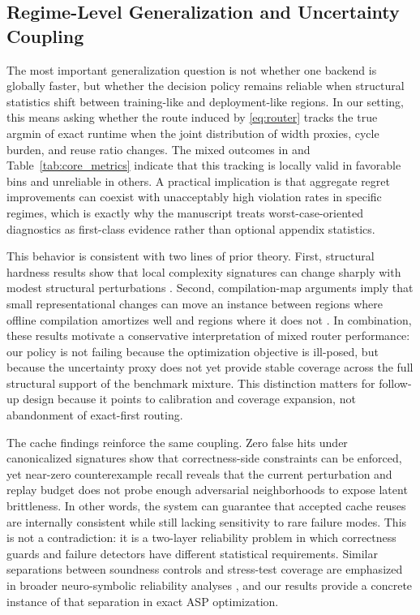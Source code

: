 \documentclass{article} %
\begin{document}
\subsection{Regime-Level Generalization and Uncertainty Coupling}
The most important generalization question is not whether one backend is globally faster, but whether the decision policy remains reliable when structural statistics shift between training-like and deployment-like regions. In our setting, this means asking whether the route induced by \eqref{eq:router} tracks the true argmin of exact runtime when the joint distribution of width proxies, cycle burden, and reuse ratio changes. The mixed outcomes in  and Table~\ref{tab:core_metrics} indicate that this tracking is locally valid in favorable bins and unreliable in others. A practical implication is that aggregate regret improvements can coexist with unacceptably high violation rates in specific regimes, which is exactly why the manuscript treats worst-case-oriented diagnostics as first-class evidence rather than optional appendix statistics.

This behavior is consistent with two lines of prior theory. First, structural hardness results show that local complexity signatures can change sharply with modest structural perturbations \citep{src_046,src_047,src_048}. Second, compilation-map arguments imply that small representational changes can move an instance between regions where offline compilation amortizes well and regions where it does not \citep{src_002,src_003,src_006,src_008}. In combination, these results motivate a conservative interpretation of mixed router performance: our policy is not failing because the optimization objective is ill-posed, but because the uncertainty proxy does not yet provide stable coverage across the full structural support of the benchmark mixture. This distinction matters for follow-up design because it points to calibration and coverage expansion, not abandonment of exact-first routing.

The cache findings reinforce the same coupling. Zero false hits under canonicalized signatures show that correctness-side constraints can be enforced, yet near-zero counterexample recall reveals that the current perturbation and replay budget does not probe enough adversarial neighborhoods to expose latent brittleness. In other words, the system can guarantee that accepted cache reuses are internally consistent while still lacking sensitivity to rare failure modes. This is not a contradiction: it is a two-layer reliability problem in which correctness guards and failure detectors have different statistical requirements. Similar separations between soundness controls and stress-test coverage are emphasized in broader neuro-symbolic reliability analyses \citep{src_028,src_029,src_041,src_044}, and our results provide a concrete instance of that separation in exact ASP optimization.
\end{document}
